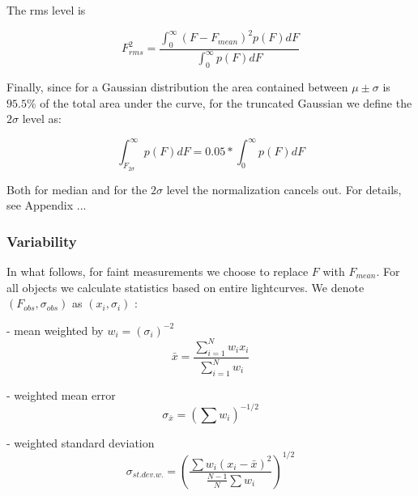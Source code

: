 \documentclass[fleqn,usenatbib]{mnras}  %
\begin{document}
The rms level is

\begin{equation}
F_{rms}^{2} = \frac{\int _{0} ^ {\infty}{(F-F_{mean})^{2} p(F) dF}}{\int _{0} ^ {\infty}{p(F) dF}} 
\end{equation}

Finally, since for a Gaussian distribution the area contained between $\mu \pm \sigma$ is $95.5 \%$ of the total area under the curve, for the truncated Gaussian we define the  $2 \sigma$ level as:

\begin{equation}
\int _{F_{2 \sigma}} ^{\infty} {p(F)dF} = 0.05 * \int _{0} ^{\infty} {p(F) dF} 
\end{equation}

Both for median and for the $2\sigma$ level the normalization cancels out. For details, see Appendix ... 


\subsubsection{Variability}


%
%


%
%
%
%
In what follows, for faint measurements we choose to replace $F$ with $F_{mean}$. For all objects we calculate statistics based on entire lightcurves. We denote $(F_{obs}, \sigma_{obs})$ as $(x_{i},\sigma_{i})$ : 

- mean weighted by  $w_{i} = (\sigma_{i})^{-2}$
\begin{equation}
\bar{x} = \frac{\sum_{i=1}^{N}{w_{i}x_{i}}}{\sum_{i=1}^{N}{w_{i}}}
\end{equation}

- weighted mean error 
\begin{equation}
\sigma_{\bar{x}} = \left( \sum{w_{i}}\right) ^{-1/2} 
\end{equation}

- weighted standard deviation 
\begin{equation}
\sigma_{st.dev.w.} = \left( \frac{\sum{w_{i}(x_{i} - \bar{x})^{2}}}{\frac{N-1}{N}\sum{w_{i}}} \right) ^ {1/2}
\end{equation}
\end{document}

